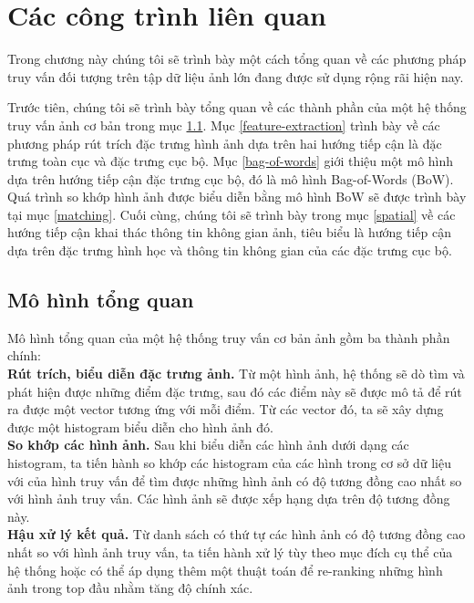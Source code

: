 \chapter{Các công trình liên quan}
\label{chapter:related}
\ifpdf
    \graphicspath{{Chapter2/Chapter2Figs/PNG/}{Chapter2/Chapter2Figs/PDF/}{Chapter2/Chapter2Figs/}}
\else
    \graphicspath{{Chapter2/Chapter2Figs/EPS/}{Chapter2/Chapter2Figs/}}
\fi


Trong chương này chúng tôi sẽ trình bày một cách tổng quan về các phương pháp truy vấn đối tượng trên tập dữ liệu ảnh lớn đang được sử dụng rộng rãi hiện nay.

Trước tiên, chúng tôi sẽ trình bày tổng quan về các thành phần của một hệ thống truy vấn ảnh cơ bản trong mục \ref{section:overall}. Mục \ref{feature-extraction} trình bày về các phương pháp rút trích đặc trưng hình ảnh dựa trên hai hướng tiếp cận là đặc trưng toàn cục và đặc trưng cục bộ. Mục \ref{bag-of-words} giới thiệu một mô hình dựa trên hướng tiếp cận đặc trưng cục bộ, đó là mô hình Bag-of-Words (BoW). Quá trình so khớp hình ảnh được biểu diễn bằng mô hình BoW sẽ được trình bày tại mục \ref{matching}. Cuối cùng, chúng tôi sẽ trình bày trong mục \ref{spatial} về các hướng tiếp cận khai thác thông tin không gian ảnh, tiêu biểu là hướng tiếp cận dựa trên đặc trưng hình học và thông tin không gian của các đặc trưng cục bộ.

\section{Mô hình tổng quan}
\label{section:overall}
Mô hình tổng quan của một hệ thống truy vấn cơ bản ảnh gồm ba thành phần chính:\\
\textbf{Rút trích, biểu diễn đặc trưng ảnh.} Từ một hình ảnh, hệ thống sẽ dò tìm và phát hiện được những điểm đặc trưng, sau đó các điểm này sẽ được mô tả để rút ra được một vector tương ứng với mỗi điểm. Từ các vector đó, ta sẽ xây dựng được một histogram biểu diễn cho hình ảnh đó.\\
\textbf{So khớp các hình ảnh.} Sau khi biểu diễn các hình ảnh dưới dạng các histogram, ta tiến hành so khớp các histogram của các hình trong cơ sở dữ liệu với của hình truy vấn để tìm được những hình ảnh có độ tương đồng cao nhất so với hình ảnh truy vấn. Các hình ảnh sẽ được xếp hạng dựa trên độ tương đồng này.\\
\textbf{Hậu xử lý kết quả.} Từ danh sách có thứ tự các hình ảnh có độ tương đồng cao nhất so với hình ảnh truy vấn, ta tiến hành xử lý tùy theo mục đích cụ thể của hệ thống hoặc có thể áp dụng thêm một thuật toán để re-ranking những hình ảnh trong top đầu nhằm tăng độ chính xác.

